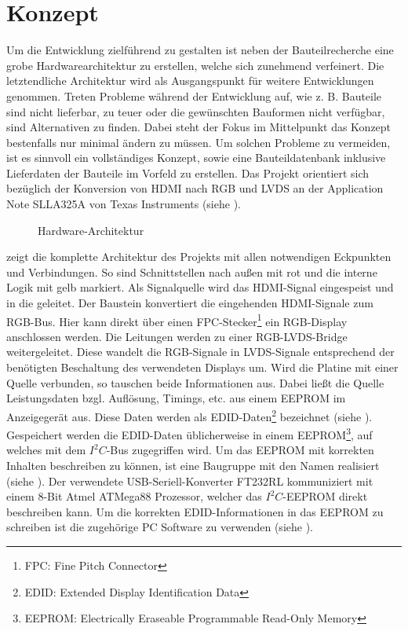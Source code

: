 \section{Konzept}
\label{sec:TeilB_Konzept}
Um die Entwicklung zielführend zu gestalten ist neben der Bauteilrecherche eine grobe Hardwarearchitektur zu erstellen, welche sich zunehmend verfeinert. Die letztendliche Architektur wird als Ausgangspunkt für weitere Entwicklungen genommen. Treten Probleme während der Entwicklung auf, wie z. B. Bauteile sind nicht lieferbar, zu teuer oder die gewünschten Bauformen nicht verfügbar, sind Alternativen zu finden. Dabei steht der Fokus im Mittelpunkt das Konzept bestenfalls nur minimal ändern zu müssen. Um solchen Probleme zu vermeiden, ist es sinnvoll ein vollständiges Konzept, sowie eine Bauteildatenbank inklusive Lieferdaten der Bauteile im Vorfeld zu erstellen. Das Projekt orientiert sich bezüglich der Konversion von HDMI nach RGB und LVDS an der Application Note SLLA325A von Texas Instruments (siehe \cite{TI2011}).
\begin{figure}[htp]
	\centering
{}
	\caption{Hardware-Architektur}
	\label{fig:teilb_architektur}
\end{figure}

 zeigt die komplette Architektur des Projekts mit allen notwendigen Eckpunkten und Verbindungen. So sind Schnittstellen nach außen mit rot und die interne Logik mit gelb markiert. Als Signalquelle wird das HDMI-Signal eingespeist und in die  geleitet. Der Baustein  konvertiert die eingehenden HDMI-Signale zum RGB-Bus. Hier kann direkt über einen FPC-Stecker\footnote{FPC: Fine Pitch Connector} ein RGB-Display anschlossen werden. Die Leitungen werden zu einer RGB-LVDS-Bridge weitergeleitet. Diese wandelt die RGB-Signale in LVDS-Signale entsprechend der benötigten Beschaltung des verwendeten Displays um. Wird die Platine mit einer Quelle verbunden, so tauschen beide Informationen aus. Dabei ließt die Quelle Leistungsdaten bzgl. Auflösung, Timings, etc. aus einem EEPROM  im Anzeigegerät aus. Diese Daten werden als EDID-Daten\footnote{EDID: Extended Display Identification Data} bezeichnet (siehe \cite{edid2000}). Gespeichert werden die EDID-Daten üblicherweise in einem EEPROM\footnote{EEPROM: Electrically Eraseable Programmable Read-Only Memory}, auf welches mit dem $I^2C$-Bus zugegriffen wird. Um das EEPROM mit korrekten Inhalten beschreiben zu können, ist eine Baugruppe mit den Namen  realisiert (siehe ). Der verwendete USB-Seriell-Konverter FT232RL kommuniziert mit einem 8-Bit Atmel ATMega88 Prozessor, welcher das $I^2C$-EEPROM direkt beschreiben kann. Um die korrekten EDID-Informationen in das EEPROM zu schreiben ist die zugehörige PC Software zu verwenden (siehe ).\newpage